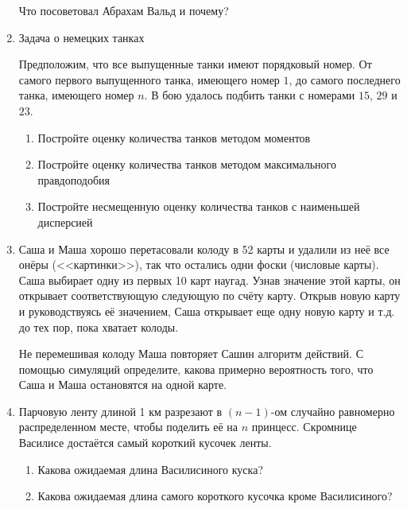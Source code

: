 \documentclass[nobib]{tufte-handout}
\begin{document}
\begin{enumerate}
Что посоветовал Абрахам Вальд и почему?

\item Задача о немецких танках

Предположим, что все выпущенные танки имеют порядковый номер. От самого первого выпущенного танка, имеющего номер $1$, до самого последнего танка, имеющего номер $n$. В бою удалось подбить танки с номерами $15$, $29$ и $23$. 

\begin{enumerate}
\item Постройте оценку количества танков методом моментов 
\item Постройте оценку количества танков методом максимального правдоподобия
\item Постройте несмещенную оценку количества танков с наименьшей дисперсией
\end{enumerate} 

\item Саша и Маша хорошо перетасовали колоду в 52 карты и удалили из неё все онёры (<<картинки>>), так что остались одни фоски (числовые карты). Саша выбирает одну из первых 10 карт наугад. Узнав значение этой карты, он открывает соответствующую следующую по счёту карту. Открыв новую карту и руководствуясь её значением, Саша открывает еще одну новую карту и т.д. до тех пор, пока хватает колоды. 

Не перемешивая колоду Маша повторяет Сашин алгоритм действий. С помощью симуляций определите, какова примерно вероятность того, что Саша и Маша остановятся на одной карте.

\item Парчовую ленту длиной 1 км разрезают в $(n-1)$-ом случайно равномерно распределенном месте, чтобы поделить её на $n$ принцесс. Скромнице Василисе достаётся самый короткий кусочек ленты. 

\begin{enumerate}
\item Какова ожидаемая длина Василисиного куска?
\item Какова ожидаемая длина самого короткого кусочка кроме Василисиного?
\end{enumerate}


\end{enumerate}
\end{document}
